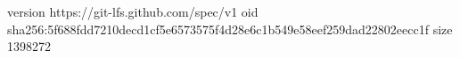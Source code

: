 version https://git-lfs.github.com/spec/v1
oid sha256:5f688fdd7210decd1cf5e6573575f4d28e6c1b549e58eef259dad22802eecc1f
size 1398272
